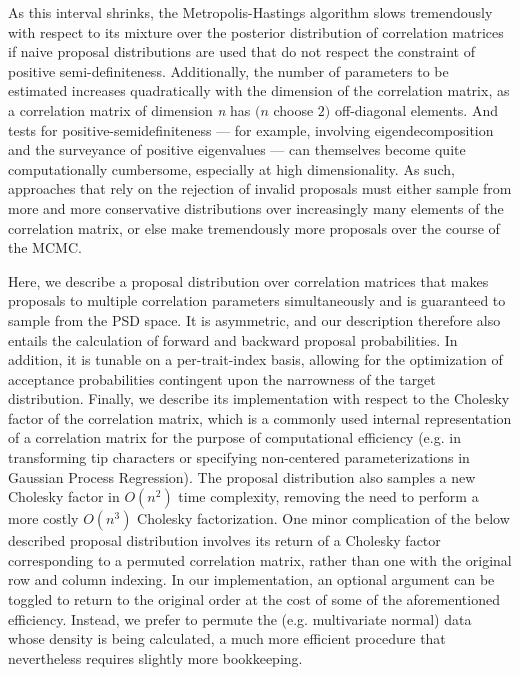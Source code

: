 \documentclass[10pt]{article}
\begin{document}
As this interval shrinks, the Metropolis-Hastings algorithm slows tremendously with respect to its mixture over the posterior distribution of correlation matrices if naive proposal distributions are used that do not respect the constraint of positive semi-definiteness. Additionally, the number of parameters to be estimated increases quadratically with the dimension of the correlation matrix, as a correlation matrix of dimension \textit{n} has $(\textit{n}$ choose $2)$ off-diagonal elements. And tests for positive-semidefiniteness --- for example, involving eigendecomposition and the surveyance of positive eigenvalues --- can themselves become quite computationally cumbersome, especially at high dimensionality. As such, approaches that rely on the rejection of invalid proposals must either sample from more and more conservative distributions over increasingly many elements of the correlation matrix, or else make tremendously more proposals over the course of the MCMC.

Here, we describe a proposal distribution over correlation matrices that makes proposals to multiple correlation parameters simultaneously and is guaranteed to sample from the PSD space. It is asymmetric, and our description therefore also entails the calculation of forward and backward proposal probabilities. In addition, it is tunable on a per-trait-index basis, allowing for the optimization of acceptance probabilities contingent upon the narrowness of the target distribution. Finally, we describe its implementation with respect to the Cholesky factor of the correlation matrix, which is a commonly used internal representation of a correlation matrix for the purpose of computational efficiency (e.g. in transforming tip characters or specifying non-centered parameterizations in Gaussian Process Regression). The proposal distribution also samples a new Cholesky factor in $O(n^2)$ time complexity, removing the need to perform a more costly $O(n^3)$ Cholesky factorization. One minor complication of the below described proposal distribution involves its return of a Cholesky factor corresponding to a permuted correlation matrix, rather than one with the original row and column indexing. In our implementation, an optional argument can be toggled to return to the original order at the cost of some of the aforementioned efficiency. Instead, we prefer to permute the (e.g. multivariate normal) data whose density is being calculated, a much more efficient procedure that nevertheless requires slightly more bookkeeping.
\end{document}

